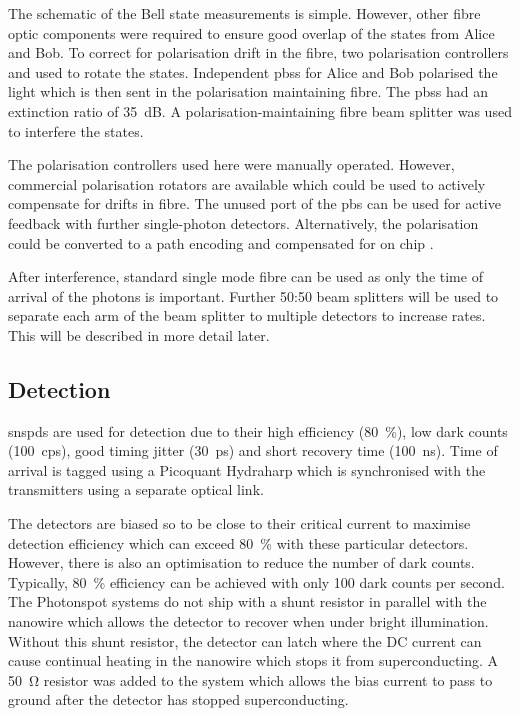 The schematic of the Bell state measurements is simple. However, other fibre optic components were required to ensure good overlap of the states from Alice and Bob. To correct for polarisation drift in the fibre, two polarisation controllers and used to rotate the states. Independent \acp{pbs} for Alice and Bob polarised the light which is then sent in the polarisation maintaining fibre. The \acp{pbs} had an extinction ratio of \SI{35}{dB}. A polarisation-maintaining fibre beam splitter was used to interfere the states.

The polarisation controllers used here were manually operated. However, commercial polarisation rotators are available which could be used to actively compensate for drifts in fibre. The unused port of the \ac{pbs} can be used for active feedback with further single-photon detectors. Alternatively, the polarisation could be converted to a path encoding and compensated for on chip \cite{wang2016}.

After interference, standard single mode fibre can be used as only the time of arrival of the photons is important. Further {50:50} beam splitters will be used to separate each arm of the beam splitter to multiple detectors to increase rates. This will be described in more detail later.



\subsection{Detection}

\Acsp{snspd} are used for detection due to their high efficiency (\SI{80}{\percent}), low dark counts (\SI{100}{cps}), good timing jitter (\SI{30}{ps}) and short recovery time (\SI{100}{ns}). Time of arrival is tagged using a Picoquant Hydraharp which is synchronised with the transmitters using a separate optical link.

The detectors are biased so to be close to their critical current to maximise detection efficiency which can exceed \SI{80}{\percent} with these particular detectors. However, there is also an optimisation to reduce the number of dark counts. Typically, \SI{80}{\percent} efficiency can be achieved with only 100 dark counts per second. The Photonspot systems do not ship with a shunt resistor in parallel with the nanowire which allows the detector to recover when under bright illumination. Without this shunt resistor, the detector can latch where the DC current can cause continual heating in the nanowire which stops it from superconducting. A \SI{50}{\ohm} resistor was added to the system which allows the bias current to pass to ground after the detector has stopped superconducting. 

